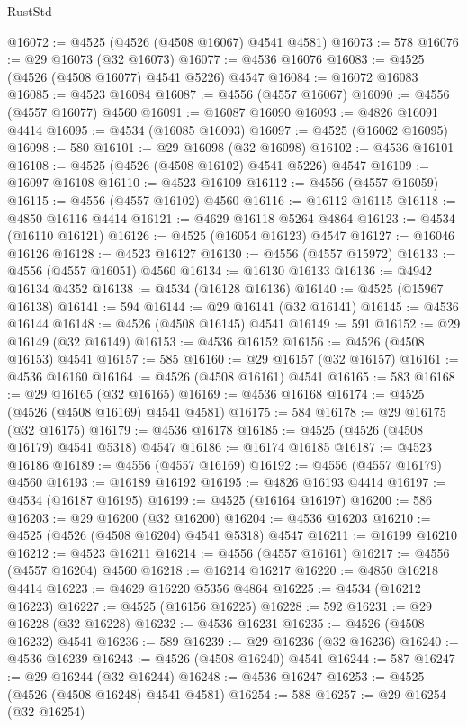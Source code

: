 \begin{lexlean}{RustStd}
\begin{coremodule}
{\begin{coremodule}
{{{{{{{{{{{{{{{{{{{{{{{{{{{{{{{{{{{{{{{{{{{{{{{{{{{{{{{@16072 := @4525 (@4526 (@4508 @16067) @4541 @4581)
@16073 := 578
@16076 := @29 @16073 (@32 @16073)
@16077 := @4536 @16076
@16083 := @4525 (@4526 (@4508 @16077) @4541 @5226) @4547
@16084 := @16072 @16083
@16085 := @4523 @16084
@16087 := @4556 (@4557 @16067)
@16090 := @4556 (@4557 @16077) @4560
@16091 := @16087 @16090
@16093 := @4826 @16091 @4414
@16095 := @4534 (@16085 @16093)
@16097 := @4525 (@16062 @16095)
@16098 := 580
@16101 := @29 @16098 (@32 @16098)
@16102 := @4536 @16101
@16108 := @4525 (@4526 (@4508 @16102) @4541 @5226) @4547
@16109 := @16097 @16108
@16110 := @4523 @16109
@16112 := @4556 (@4557 @16059)
@16115 := @4556 (@4557 @16102) @4560
@16116 := @16112 @16115
@16118 := @4850 @16116 @4414
@16121 := @4629 @16118 @5264 @4864
@16123 := @4534 (@16110 @16121)
@16126 := @4525 (@16054 @16123) @4547
@16127 := @16046 @16126
@16128 := @4523 @16127
@16130 := @4556 (@4557 @15972)
@16133 := @4556 (@4557 @16051) @4560
@16134 := @16130 @16133
@16136 := @4942 @16134 @4352
@16138 := @4534 (@16128 @16136)
@16140 := @4525 (@15967 @16138)
@16141 := 594
@16144 := @29 @16141 (@32 @16141)
@16145 := @4536 @16144
@16148 := @4526 (@4508 @16145) @4541
@16149 := 591
@16152 := @29 @16149 (@32 @16149)
@16153 := @4536 @16152
@16156 := @4526 (@4508 @16153) @4541
@16157 := 585
@16160 := @29 @16157 (@32 @16157)
@16161 := @4536 @16160
@16164 := @4526 (@4508 @16161) @4541
@16165 := 583
@16168 := @29 @16165 (@32 @16165)
@16169 := @4536 @16168
@16174 := @4525 (@4526 (@4508 @16169) @4541 @4581)
@16175 := 584
@16178 := @29 @16175 (@32 @16175)
@16179 := @4536 @16178
@16185 := @4525 (@4526 (@4508 @16179) @4541 @5318) @4547
@16186 := @16174 @16185
@16187 := @4523 @16186
@16189 := @4556 (@4557 @16169)
@16192 := @4556 (@4557 @16179) @4560
@16193 := @16189 @16192
@16195 := @4826 @16193 @4414
@16197 := @4534 (@16187 @16195)
@16199 := @4525 (@16164 @16197)
@16200 := 586
@16203 := @29 @16200 (@32 @16200)
@16204 := @4536 @16203
@16210 := @4525 (@4526 (@4508 @16204) @4541 @5318) @4547
@16211 := @16199 @16210
@16212 := @4523 @16211
@16214 := @4556 (@4557 @16161)
@16217 := @4556 (@4557 @16204) @4560
@16218 := @16214 @16217
@16220 := @4850 @16218 @4414
@16223 := @4629 @16220 @5356 @4864
@16225 := @4534 (@16212 @16223)
@16227 := @4525 (@16156 @16225)
@16228 := 592
@16231 := @29 @16228 (@32 @16228)
@16232 := @4536 @16231
@16235 := @4526 (@4508 @16232) @4541
@16236 := 589
@16239 := @29 @16236 (@32 @16236)
@16240 := @4536 @16239
@16243 := @4526 (@4508 @16240) @4541
@16244 := 587
@16247 := @29 @16244 (@32 @16244)
@16248 := @4536 @16247
@16253 := @4525 (@4526 (@4508 @16248) @4541 @4581)
@16254 := 588
@16257 := @29 @16254 (@32 @16254)
}}}}}}}}}}}}}}}}}}}}}}}}}}}}}}}}}}}}}}}}}}}}}}}}}}}}}}}
\end{coremodule}}
\end{coremodule}
\end{lexlean}
